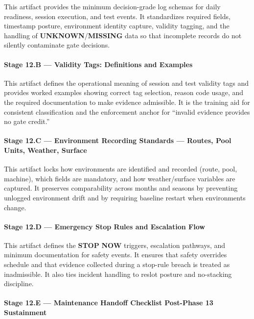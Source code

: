\documentclass[10pt]{article}
\begin{document}
This artifact provides the minimum decision-grade log schemas for daily readiness, session execution, and test events. It standardizes required fields, timestamp posture, environment identity capture, validity tagging, and the handling of \textbf{UNKNOWN}/\textbf{MISSING} data so that incomplete records do not silently contaminate gate decisions.

\paragraph*{Stage 12.B — Validity Tags: Definitions and Examples}

This artifact defines the operational meaning of session and test validity tags and provides worked examples showing correct tag selection, reason code usage, and the required documentation to make evidence admissible. It is the training aid for consistent classification and the enforcement anchor for “invalid evidence provides no gate credit.”

\paragraph*{Stage 12.C — Environment Recording Standards — Routes, Pool Units, Weather, Surface}

This artifact locks how environments are identified and recorded (route, pool, machine), which fields are mandatory, and how weather/surface variables are captured. It preserves comparability across months and seasons by preventing unlogged environment drift and by requiring baseline restart when environments change.

\paragraph*{Stage 12.D — Emergency Stop Rules and Escalation Flow}

This artifact defines the \textbf{STOP} \textbf{NOW} triggers, escalation pathways, and minimum documentation for safety events. It ensures that safety overrides schedule and that evidence collected during a stop-rule breach is treated as inadmissible. It also ties incident handling to reslot posture and no-stacking discipline.

\paragraph*{Stage 12.E — Maintenance Handoff Checklist Post-Phase 13 Sustainment}
\end{document}
